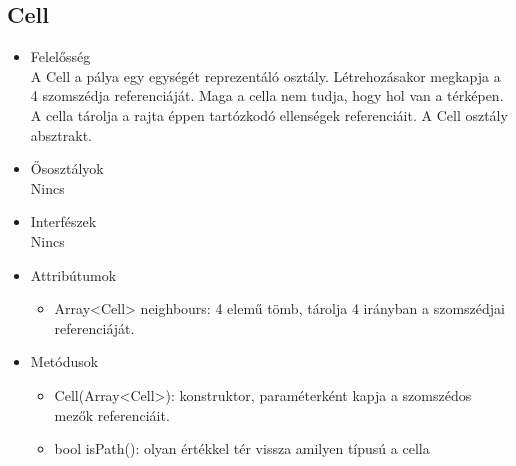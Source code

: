 \subsection{Cell}
\begin{itemize}
\item Felelősség\\
A Cell a pálya egy egységét reprezentáló osztály. Létrehozásakor megkapja a 4 szomszédja referenciáját. Maga a cella nem tudja, hogy hol van a térképen. A cella tárolja a rajta éppen tartózkodó ellenségek referenciáit. A Cell osztály absztrakt.
\item Ősosztályok\\
Nincs
\item Interfészek\\
Nincs
\item Attribútumok
	\begin{itemize}
		\item Array<Cell> neighbours: 4 elemű tömb, tárolja 4 irányban a szomszédjai referenciáját.

		
	\end{itemize}
\item Metódusok
	\begin{itemize}
		
		\item Cell(Array<Cell>): konstruktor, paraméterként kapja a szomszédos mezők referenciáit.
		\item bool isPath(): olyan értékkel tér vissza amilyen típusú a cella 
		
		
	\end{itemize}
\end{itemize}
